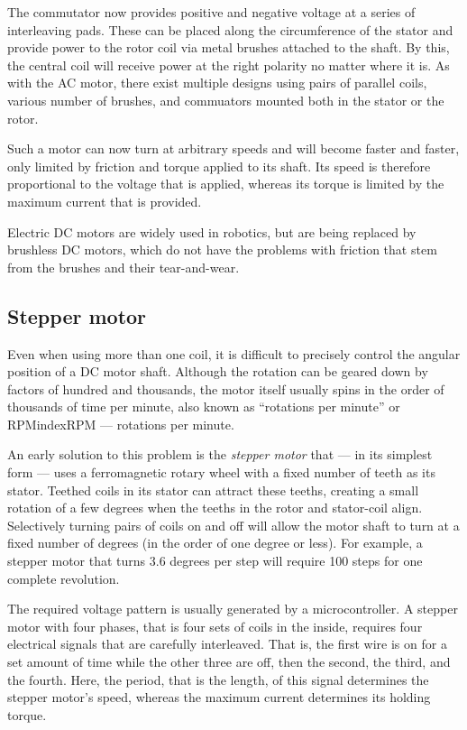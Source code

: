 The commutator now provides positive and negative voltage at a series of interleaving pads. These can be placed along the circumference of the stator and provide power to the rotor coil via metal brushes attached to the shaft. By this, the central coil will receive power at the right polarity no matter where it is. As with the AC motor, there exist multiple designs using pairs of parallel coils, various number of brushes, and commuators mounted both in the stator or the rotor.

Such a motor can now turn at arbitrary speeds and will become faster and faster, only limited by friction and torque applied to its shaft. Its speed is therefore proportional to the voltage that is applied, whereas its torque is limited by the maximum current that is provided. 

Electric DC motors are widely used in robotics, but are being replaced by brushless DC motors, which do not have the problems with friction that stem from the brushes and their tear-and-wear.  

\subsection{Stepper motor}
Even when using more than one coil, it is difficult to precisely control the angular position of a DC motor shaft. Although the rotation can be geared down by factors of hundred and thousands, the motor itself usually spins in the order of thousands of time per minute, also known as ``rotations per minute'' or RPMindex{RPM --- rotations per minute}.

An early solution to this problem is the \emph{stepper motor} that --- in its simplest form --- uses a ferromagnetic rotary wheel with a fixed number of teeth as its stator. Teethed coils in its stator can attract these teeths, creating a small rotation of a few degrees when the teeths in the rotor and stator-coil align. Selectively turning pairs of coils on and off will allow the motor shaft to turn at a fixed number of degrees (in the order of one degree or less). For example, a stepper motor that turns 3.6 degrees per step will require 100 steps for one complete revolution.

The required voltage pattern is usually generated by a microcontroller. A stepper motor with four phases, that is four sets of coils in the inside, requires four electrical signals that are carefully interleaved. That is, the first wire is on for a set amount of time while the other three are off, then the second, the third, and the fourth. Here, the period, that is the length, of this signal determines the stepper motor's speed, whereas the maximum current determines its holding torque. 

